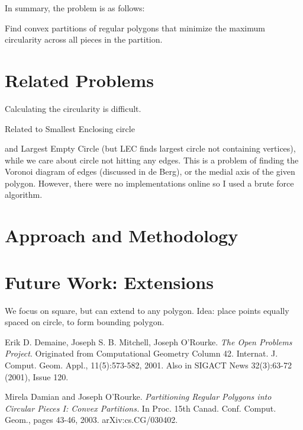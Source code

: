 \documentclass[11pt]{article}
\begin{document}
In summary, the problem is as follows:
\begin{goal*}Find convex partitions of regular polygons that minimize the maximum circularity across all pieces in the partition.
\end{goal*}

\section{Related Problems}

Calculating the circularity is difficult. 

Related to Smallest Enclosing circle

and Largest Empty Circle (but LEC finds largest circle not containing vertices), while we care about circle not hitting any edges.
This is a problem of finding the Voronoi diagram of edges (discussed in de Berg), or the medial axis of the given polygon. However, there were no implementations online so I used a brute force algorithm.
\section{Approach and Methodology}

\newpage

\section{Future Work: Extensions}

We focus on square, but can extend to any polygon. Idea: place points equally spaced on circle, to form bounding polygon. 

\begin{thebibliography}{9}
    Erik D. Demaine, Joseph S. B. Mitchell, Joseph O'Rourke. \textit{The Open Problems Project}. 
    Originated from Computational Geometry Column 42. Internat. J. Comput. Geom. Appl., 11(5):573-582, 2001. Also in SIGACT News 32(3):63-72 (2001), Issue 120.

    Mirela Damian and Joseph O'Rourke. \textit{Partitioning Regular Polygons into Circular Pieces I: Convex Partitions.} In Proc. 15th Canad. Conf. Comput. Geom., pages 43-46, 2003. arXiv:cs.CG/030402.    


\end{thebibliography}
\end{document}
